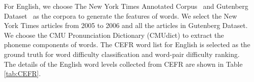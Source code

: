 For English, we choose The New York Times Annotated Corpus~\cite{Evan2008newyork} and Gutenberg Dataset~\cite{lahiri:2014:SRW} as the corpora to generate the features of words.
We select the New York Times articles from 2005 to 2006 and all the articles in Gutenberg Dataset.
We choose the CMU Pronunciation Dictionary (CMUdict) to extract the phoneme components of words.
The CEFR word list for English
is selected 
as the ground truth for word difficulty classification and word-pair difficulty ranking. 
The details of the English word levels collected from CEFR are 
shown in Table \ref{tab:CEFR}.



%	

